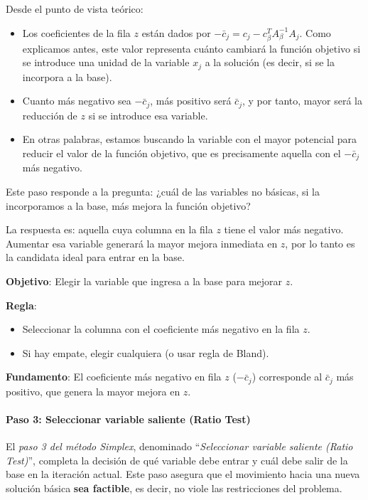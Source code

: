 Desde el punto de vista teórico:
\begin{itemize}
  \item Los coeficientes de la fila \(z\) están dados por \(-\bar{c}_j = c_j - c_\beta^T A_\beta^{-1} A_j\). Como explicamos antes, este valor representa cuánto cambiará la función objetivo si se introduce una unidad de la variable \(x_j\) a la solución (es decir, si se la incorpora a la base).
  \item Cuanto más negativo sea \(-\bar{c}_j\), más positivo será \(\bar{c}_j\), y por tanto, mayor será la reducción de \(z\) si se introduce esa variable.
  \item En otras palabras, estamos buscando la variable con el mayor potencial para reducir el valor de la función objetivo, que es precisamente aquella con el \(-\bar{c}_j\) más negativo.
\end{itemize}

Este paso responde a la pregunta: ¿cuál de las variables no básicas, si la incorporamos a la base, más mejora la función objetivo?

La respuesta es: aquella cuya columna en la fila \(z\) tiene el valor más negativo. Aumentar esa variable generará la mayor mejora inmediata en \(z\), por lo tanto es la candidata ideal para entrar en la base.

\begin{tcolorbox}[title=Resumen del paso 2]
  \noindent \textbf{Objetivo}: Elegir la variable que ingresa a la base para mejorar \(z\).
  
  \noindent \textbf{Regla}:
  \begin{itemize}
    \item Seleccionar la columna con el coeficiente más negativo en la fila \(z\).
    \item Si hay empate, elegir cualquiera (o usar regla de Bland).
  \end{itemize}
  
  \noindent \textbf{Fundamento}: El coeficiente más negativo en fila \(z\) (\(-\bar{c}_j\)) corresponde al \(\bar{c}_j\) más positivo, que genera la mayor mejora en \(z\).
\end{tcolorbox}

\paragraph{Paso 3: Seleccionar variable saliente (Ratio Test)}

El \textit{paso 3 del método Simplex}, denominado ``\textit{Seleccionar variable saliente (Ratio Test)}'', completa la decisión de qué variable debe entrar y cuál debe salir de la base en la iteración actual. Este paso asegura que el movimiento hacia una nueva solución básica \textbf{sea factible}, es decir, no viole las restricciones del problema.

